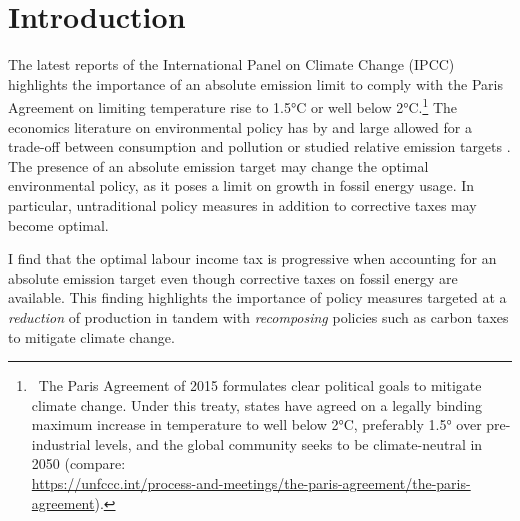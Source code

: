 \section{Introduction}


The latest reports of the International Panel on Climate Change (IPCC) \citep{ IPCC2022, Rogelj2018MitigationDevelopment.} highlights the importance of an absolute emission limit to comply with the Paris Agreement on limiting temperature rise to 1.5°C or well below 2°C.\footnote{ \ The Paris Agreement of 2015 formulates clear political goals to mitigate climate change. Under this treaty, states have agreed on a legally binding maximum increase in temperature to well below 2°C, preferably 1.5° over pre-industrial levels, and the global community seeks to be climate-neutral in 2050  (compare:\\ \url{https://unfccc.int/process-and-meetings/the-paris-agreement/the-paris-agreement}). 
} 
The economics literature on environmental policy has by and large allowed for a trade-off between consumption and pollution \citep{Barrage2019OptimalPolicy, Golosov2014OptimalEquilibrium} or studied relative emission targets \citep{Fried2018ClimateAnalysis}. 
The presence of an absolute emission target may change the optimal environmental policy, as it poses a limit on growth in fossil energy usage.
In particular, untraditional policy measures in addition to corrective taxes may become optimal. %

 I find that the optimal labour income tax is progressive when accounting for an absolute emission target even though corrective taxes on fossil energy are available. This finding highlights the importance of policy measures targeted at a \textit{reduction} of production in tandem with \textit{recomposing} policies such as carbon taxes to mitigate climate change. %

